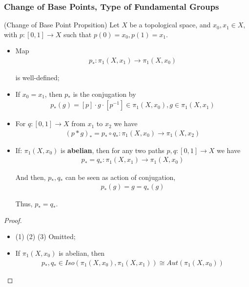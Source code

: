 \documentclass[Total.tex]{subfiles}
\begin{document}
	\subsubsection{Change of Base Points, Type of Fundamental Groups}	
	\begin{proposition}
		(Change of Base Point Propsition) Let $X$ be a topological space, and $x_0,x_1\in X$, with $p:[0,1]\rightarrow X$ such that $p(0)=x_0,p(1)=x_1$.
		
		\begin{itemize}
			\item Map
			\begin{gather*}
				p_*:\pi_1(X,x_1)\rightarrow \pi_1(X,x_0)
			\end{gather*}
			
			is well-defined;
			\item If $x_0=x_1$, then $p_*$ is the conjugation by 
			\begin{gather*}
				p_*(g)=[p]\cdot g\cdot [p^{-1}]\in \pi_1(X,x_0),g\in \pi_1(X,x_1)
			\end{gather*}
			\item For $q:[0,1]\rightarrow X$ from $x_1$ to $x_2$ we have
			\begin{gather*}
				(p*g)_*=p_*\circ q_*:\pi_1(X,x_0)\rightarrow \pi_1(X,x_2)
			\end{gather*}
			\item If: $\pi_1(X,x_0)$ is \textbf{abelian}, then for any two paths $p,q:[0,1]\rightarrow X$ we have
			\begin{gather*}
				p_*=q_*:\pi_1(X,x_1)\rightarrow \pi_1(X,x_0)
			\end{gather*}
			
			And then, $p_*,q_*$ can be seen as action of conjugation, 
			\begin{gather*}
				p_*(g)=g=q_*(g)
			\end{gather*}
			
			Thus, $p_*=q_*$.
		\end{itemize}
	\end{proposition}
	\begin{proof}
		\begin{itemize}
			\item (1) (2) (3) Omitted;
			\item If $\pi_1(X,x_0)$ is abelian, then 
			\begin{gather*}
				p_*,q_*\in Iso(\pi_1(X,x_0),\pi_1(X,x_1))\cong Aut(\pi_1(X,x_0))
			\end{gather*}
		\end{itemize}
	\end{proof}
	
\end{document}
